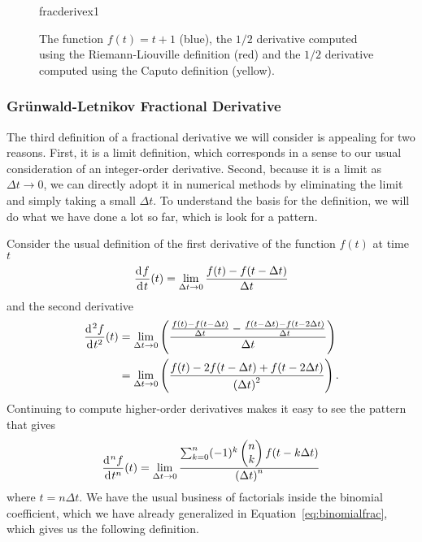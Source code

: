     \begin{figure}
      \centering
      {fracderivex1}
      \caption{The function $f(t) = t + 1$ (blue), the $1/2$ derivative computed using the Riemann-Liouville definition (red) and the $1/2$ derivative computed using the Caputo definition (yellow).}
      \label{fig:fracderivex1}
    \end{figure}

    \subsubsection{Gr\"unwald-Letnikov Fractional Derivative}
    The third definition of a fractional derivative we will consider is appealing for two reasons. First, it is a limit definition, which corresponds in a sense to our usual consideration of an integer-order derivative. Second, because it is a limit as $\Delta t \rightarrow 0$, we can directly adopt it in numerical methods by eliminating the limit and simply taking a small $\Delta t$. To understand the basis for the definition, we will do what we have done a lot so far, which is look for a pattern.

    Consider the usual definition of the first derivative of the function $f(t)$ at time $t$
    \begin{equation*}
      \frac{\operatorname{d}\hspace*{-1pt} f}{\operatorname{d}\hspace*{-1pt} t}(t) = \lim_{\Delta t \rightarrow 0} \frac{f(t) - f(t - \Delta t)}{\Delta t} 
    \end{equation*}
    and the second derivative
    \begin{align*}
      \frac{\operatorname{d}\hspace*{-1pt}^2 f}{\operatorname{d}\hspace*{-1pt} t^2}(t) &= \lim_{\Delta t \rightarrow 0} \left( \frac{ \frac{f(t) - f(t - \Delta t)}{\Delta t}  - \frac{f(t - \Delta t) - f(t - 2 \Delta t)}{\Delta t}  }{\Delta t} \right) \\
      &= \lim_{\Delta t \rightarrow 0} \left( \frac{f(t) - 2 f(t - \Delta t) + f(t - 2 \Delta t)}{\left( \Delta t \right)^2} \right).
    \end{align*}
    Continuing to compute higher-order derivatives makes it easy to see the pattern that gives
    \begin{equation*}
      \frac{\operatorname{d}\hspace*{-1pt}^n f}{\operatorname{d}\hspace*{-1pt} t^n}(t) = \lim_{\Delta t \rightarrow 0} \frac{ \sum_{k=0}^n (-1)^k \begin{pmatrix} n \\ k \end{pmatrix} f(t - k \Delta t) }{\left( \Delta t \right)^n}
    \end{equation*}
    where $t = n \Delta t$. We have the usual business of factorials inside the binomial coefficient, which we have already generalized in Equation~\ref{eq:binomialfrac}, which gives us the following definition.

